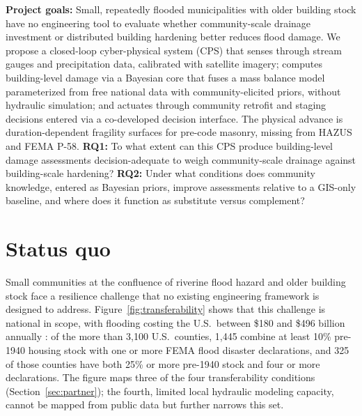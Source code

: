 \documentclass[11pt]{article}
\begin{document}
\setlength{\baselineskip}{12.6pt}
\setlength{\normalbaselineskip}{12.6pt}


\begin{tcolorbox}[colback=mycmykcolor, colframe=black, boxrule=1pt, coltext=black]
\textbf{Project goals:}
Small, repeatedly flooded municipalities with older building stock have no
engineering tool to evaluate whether community-scale drainage investment or
distributed building hardening better reduces flood damage.
We propose a closed-loop cyber-physical system (CPS) that
senses through stream gauges and precipitation data, calibrated with satellite imagery;
computes building-level damage via a Bayesian core that fuses a mass balance
model parameterized from free national data with community-elicited priors,
without hydraulic simulation;
and actuates through community retrofit and staging decisions entered via a
co-developed decision interface.
The physical advance is duration-dependent fragility surfaces for pre-code
masonry, missing from HAZUS and FEMA P-58.
\textbf{RQ1:} To what extent can this CPS produce building-level damage
assessments decision-adequate to weigh community-scale drainage against
building-scale hardening?
\textbf{RQ2:} Under what conditions does community knowledge, entered as
Bayesian priors, improve assessments relative to a GIS-only baseline, and
where does it function as substitute versus complement?
\end{tcolorbox}
\vspace{-0.5cm}
\normalsize


\section{Status quo}

Small communities at the confluence of riverine flood hazard and older building
stock face a resilience challenge that no existing engineering framework is designed
to address.
Figure~\ref{fig:transferability} shows that this challenge is national in scope, with flooding costing the U.S.\ between \$180 and \$496 billion annually \cite{JEC2024FloodingCosts}: of the more than 3,100 U.S.\ counties, 1,445 combine at least 10\% pre-1940 housing stock with one or more FEMA flood disaster declarations, and 325 of those counties have both 25\% or more pre-1940 stock and four or more declarations. The figure maps three of the four transferability conditions (Section~\ref{sec:partner}); the fourth, limited local hydraulic modeling capacity, cannot be mapped from public data but further narrows this set.
\end{document}
